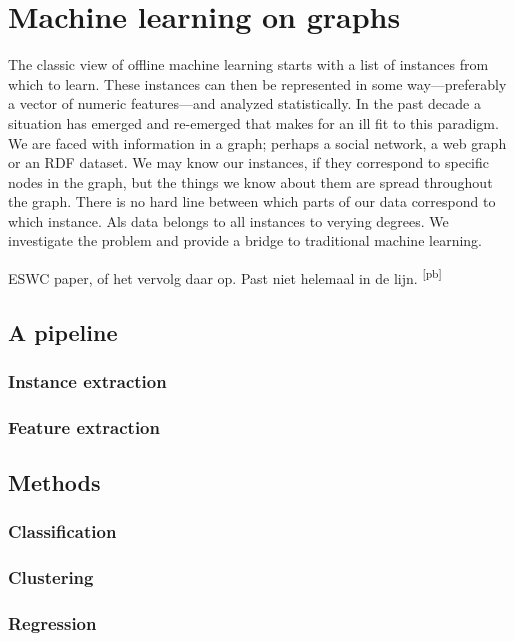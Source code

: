 \documentclass{thesis}
\newcommand{\pb}[1]{\textcolor{OliveGreen}{\small #1 \textsuperscript{[pb]} }}
\begin{document}
\chapter{Machine learning on graphs}


\begin{summary}The classic view of offline machine learning starts with a list of instances from which to learn. These instances can then be represented in some way---preferably a vector of numeric features---and analyzed statistically. In the past decade a situation has emerged and re-emerged that makes for an ill fit to this paradigm. We are faced with information in a graph; perhaps a social network, a web graph or an RDF dataset. We may know our instances, if they correspond to specific nodes in the graph, but the things we know about them are spread throughout the graph. There is no hard line between which parts of our data correspond to which instance. Als data belongs to all instances to verying degrees. We investigate the problem and provide a bridge to traditional machine learning.
\end{summary}

\pb{ESWC paper, of het vervolg daar op. Past niet helemaal in de lijn.}

\section{A pipeline}
\subsection{Instance extraction}
\subsection{Feature extraction}
\section{Methods}
\subsection{Classification}
\subsection{Clustering}
\subsection{Regression}
\end{document}
